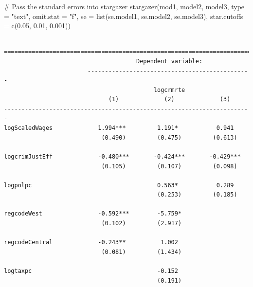 \documentclass[]{article}
\newenvironment{Shaded}{}{}
\newcommand{\CommentTok}[1]{\textcolor[rgb]{0.00,0.50,0.00}{#1}}
\newcommand{\DataTypeTok}[1]{#1}
\newcommand{\FloatTok}[1]{#1}
\newcommand{\KeywordTok}[1]{\textcolor[rgb]{0.00,0.00,1.00}{#1}}
\newcommand{\NormalTok}[1]{#1}
\newcommand{\StringTok}[1]{\textcolor[rgb]{0.00,0.50,0.50}{#1}}
\begin{document}
\begin{Shaded}
\begin{Highlighting}[]
\CommentTok{# Pass the standard errors into stargazer}
\KeywordTok{stargazer}\NormalTok{(mod1, model2, model3, }\DataTypeTok{type =} \StringTok{"text"}\NormalTok{, }\DataTypeTok{omit.stat =} \StringTok{"f"}\NormalTok{,}
          \DataTypeTok{se =} \KeywordTok{list}\NormalTok{(se.model1, se.model2, se.model3),}
          \DataTypeTok{star.cutoffs =} \KeywordTok{c}\NormalTok{(}\FloatTok{0.05}\NormalTok{, }\FloatTok{0.01}\NormalTok{, }\FloatTok{0.001}\NormalTok{))}
\end{Highlighting}
\end{Shaded}

\begin{verbatim}

=======================================================================
                                      Dependent variable:              
                        -----------------------------------------------
                                           logcrmrte                   
                              (1)             (2)             (3)      
-----------------------------------------------------------------------
logScaledWages             1.994***         1.191*           0.941     
                            (0.490)         (0.475)         (0.613)    
                                                                       
logcrimJustEff             -0.480***       -0.424***       -0.429***   
                            (0.105)         (0.107)         (0.098)    
                                                                       
logpolpc                                    0.563*           0.289     
                                            (0.253)         (0.185)    
                                                                       
regcodeWest                -0.592***        -5.759*                    
                            (0.102)         (2.917)                    
                                                                       
regcodeCentral             -0.243**          1.002                     
                            (0.081)         (1.434)                    
                                                                       
logtaxpc                                    -0.152                     
                                            (0.191)                    
                                                                       

\end{verbatim}
\end{document}
